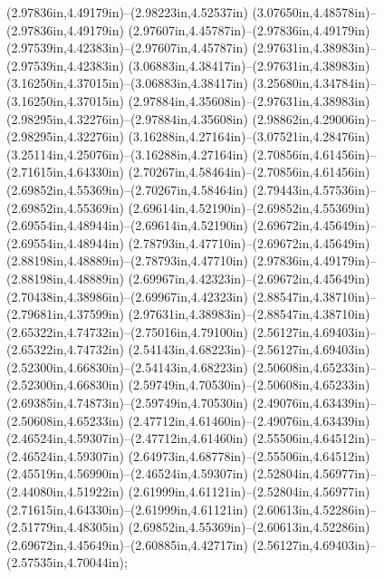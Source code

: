 (2.97836in,4.49179in)--(2.98223in,4.52537in) (3.07650in,4.48578in)--(2.97836in,4.49179in) (2.97607in,4.45787in)--(2.97836in,4.49179in) (2.97539in,4.42383in)--(2.97607in,4.45787in) (2.97631in,4.38983in)--(2.97539in,4.42383in) (3.06883in,4.38417in)--(2.97631in,4.38983in) (3.16250in,4.37015in)--(3.06883in,4.38417in) (3.25680in,4.34784in)--(3.16250in,4.37015in) (2.97884in,4.35608in)--(2.97631in,4.38983in) (2.98295in,4.32276in)--(2.97884in,4.35608in) (2.98862in,4.29006in)--(2.98295in,4.32276in) (3.16288in,4.27164in)--(3.07521in,4.28476in) (3.25114in,4.25076in)--(3.16288in,4.27164in) (2.70856in,4.61456in)--(2.71615in,4.64330in) (2.70267in,4.58464in)--(2.70856in,4.61456in) (2.69852in,4.55369in)--(2.70267in,4.58464in) (2.79443in,4.57536in)--(2.69852in,4.55369in) (2.69614in,4.52190in)--(2.69852in,4.55369in) (2.69554in,4.48944in)--(2.69614in,4.52190in) (2.69672in,4.45649in)--(2.69554in,4.48944in) (2.78793in,4.47710in)--(2.69672in,4.45649in) (2.88198in,4.48889in)--(2.78793in,4.47710in) (2.97836in,4.49179in)--(2.88198in,4.48889in) (2.69967in,4.42323in)--(2.69672in,4.45649in) (2.70438in,4.38986in)--(2.69967in,4.42323in) (2.88547in,4.38710in)--(2.79681in,4.37599in) (2.97631in,4.38983in)--(2.88547in,4.38710in) (2.65322in,4.74732in)--(2.75016in,4.79100in) (2.56127in,4.69403in)--(2.65322in,4.74732in) (2.54143in,4.68223in)--(2.56127in,4.69403in) (2.52300in,4.66830in)--(2.54143in,4.68223in) (2.50608in,4.65233in)--(2.52300in,4.66830in) (2.59749in,4.70530in)--(2.50608in,4.65233in) (2.69385in,4.74873in)--(2.59749in,4.70530in) (2.49076in,4.63439in)--(2.50608in,4.65233in) (2.47712in,4.61460in)--(2.49076in,4.63439in) (2.46524in,4.59307in)--(2.47712in,4.61460in) (2.55506in,4.64512in)--(2.46524in,4.59307in) (2.64973in,4.68778in)--(2.55506in,4.64512in) (2.45519in,4.56990in)--(2.46524in,4.59307in) (2.52804in,4.56977in)--(2.44080in,4.51922in) (2.61999in,4.61121in)--(2.52804in,4.56977in) (2.71615in,4.64330in)--(2.61999in,4.61121in) (2.60613in,4.52286in)--(2.51779in,4.48305in) (2.69852in,4.55369in)--(2.60613in,4.52286in) (2.69672in,4.45649in)--(2.60885in,4.42717in) (2.56127in,4.69403in)--(2.57535in,4.70044in);
